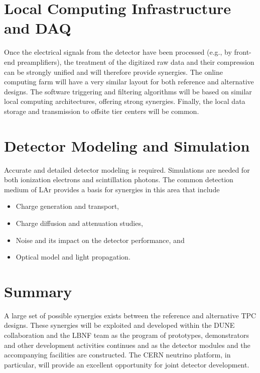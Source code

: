 \section{Local Computing Infrastructure and DAQ}

Once the electrical signals from the detector have been processed
(e.g., by front-end preamplifiers), the treatment of the digitized raw data and
their compression can be strongly unified and will therefore provide
synergies. The online computing farm will have a very similar layout
for both reference and alternative designs. The software triggering and
filtering algorithms will be based on similar local computing
architectures, offering strong synergies. Finally, the local data
storage and transmission to offsite tier centers will be common.


\section{Detector Modeling and Simulation}

Accurate and detailed detector modeling is required.  Simulations are
needed for both ionization electrons and scintillation photons. The
common detection medium of
LAr provides a basis for synergies in this area that include
\begin{itemize}
\item Charge generation and transport,
\item Charge diffusion and attenuation studies,
\item Noise and its impact on the detector performance, and
\item Optical model and light propagation.
\end{itemize}

\section{Summary}
A large set of possible synergies exists between the reference and
alternative TPC designs. These synergies will be exploited and
developed within the DUNE collaboration and the LBNF team as the
program of prototypes, demonstrators and other development activities
continues and as the detector modules and the accompanying facilities
are constructed. The CERN neutrino platform, in particular, will
provide an excellent opportunity for joint detector development.

